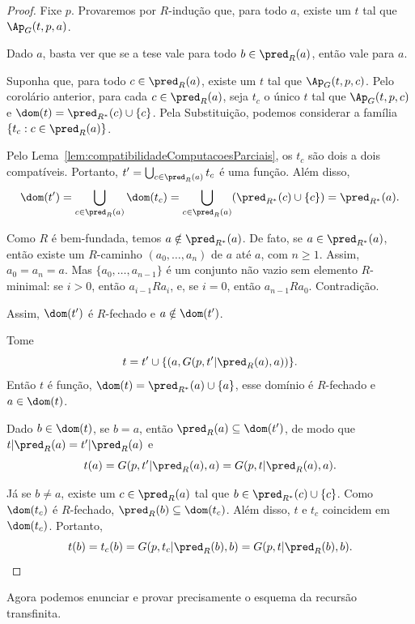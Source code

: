 \begin{proof}
    Fixe $p$.
    Provaremos por $R$-indução que, para todo $a$, existe um $t$ tal que $\Ap_G(t, p, a)$.

    Dado $a$, basta ver que se a tese vale para todo $b\in \pred_{R}(a)$, então vale para $a$.

    Suponha que, para todo $c\in \pred_{R}(a)$, existe um $t$ tal que $\Ap_G(t, p, c)$.
    Pelo corolário anterior, para cada $c\in \pred_{R}(a)$, seja $t_c$ o único $t$ tal que $\Ap_G(t, p, c)$ e $\dom(t)=\pred_{R^*}(c)\cup\{c\}$.
    Pela Substituição, podemos considerar a família $\{t_c: c\in \pred_{R}(a)\}$.

    Pelo Lema~\ref{lem:compatibilidadeComputacoesParciais}, os $t_c$ são dois a dois compatíveis.
    Portanto, $t'=\bigcup_{c\in \pred_{R}(a)} t_c$ é uma função.
    Além disso,
    \[
        \dom(t')=\bigcup_{c\in \pred_{R}(a)} \dom(t_c)
        =\bigcup_{c\in \pred_{R}(a)}(\pred_{R^*}(c)\cup\{c\})
        =\pred_{R^*}(a).
    \]

    Como $R$ é bem-fundada, temos $a\notin \pred_{R^*}(a)$.
    De fato, se $a\in \pred_{R^*}(a)$, então existe um $R$-caminho $(a_0,\dots,a_n)$ de $a$ até $a$, com $n\geq 1$.
    Assim, $a_0=a_n=a$.
    Mas $\{a_0,\dots,a_{n-1}\}$ é um conjunto não vazio sem elemento $R$-minimal: se $i>0$, então $a_{i-1}Ra_i$, e, se $i=0$, então $a_{n-1}Ra_0$.
    Contradição.

    Assim, $\dom(t')$ é $R$-fechado e $a\notin \dom(t')$.

    Tome
    \[
        t=t'\cup\{(a, G(p, t'|\pred_{R}(a), a))\}.
    \]
    Então $t$ é função, $\dom(t)=\pred_{R^*}(a)\cup\{a\}$, esse domínio é $R$-fechado e $a\in \dom(t)$.

    Dado $b\in \dom(t)$, se $b=a$, então $\pred_{R}(a)\subseteq \dom(t')$, de modo que $t|\pred_{R}(a)=t'|\pred_{R}(a)$ e
    \[
        t(a)=G(p, t'|\pred_{R}(a), a)=G(p, t|\pred_{R}(a), a).
    \]

    Já se $b\neq a$, existe um $c\in \pred_{R}(a)$ tal que $b\in \pred_{R^*}(c)\cup\{c\}$.
    Como $\dom(t_c)$ é $R$-fechado, $\pred_{R}(b)\subseteq \dom(t_c)$.
    Além disso, $t$ e $t_c$ coincidem em $\dom(t_c)$.
    Portanto,
    \[
        t(b)=t_c(b)=G(p, t_c|\pred_{R}(b), b)=G(p, t|\pred_{R}(b), b).
    \]
\end{proof}

Agora podemos enunciar e provar precisamente o esquema da recursão transfinita.

